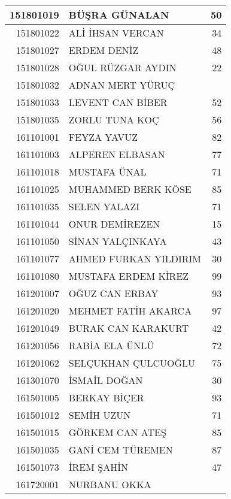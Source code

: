 \documentclass[12pt]{article}
\begin{document}
\begin{longtable}{||r||l||r||}
    \midrule
    151801019 & BÜŞRA GÜNALAN & 50 \\
    \midrule
    151801022 & ALİ İHSAN VERCAN & 34 \\
    \midrule
    151801027 & ERDEM DENİZ & 48 \\
    \midrule
    151801028 & OĞUL RÜZGAR AYDIN & 22 \\
    \midrule
    151801032 & ADNAN MERT YÜRUÇ &  \\
    \midrule
    151801033 & LEVENT CAN BİBER & 52 \\
    \midrule
    151801035 & ZORLU TUNA KOÇ & 56 \\
    \midrule
    161101001 & FEYZA YAVUZ & 82 \\
    \midrule
    161101003 & ALPEREN ELBASAN & 77 \\
    \midrule
    161101018 & MUSTAFA ÜNAL & 71 \\
    \midrule
    161101025 & MUHAMMED BERK KÖSE & 85 \\
    \midrule
    161101035 & SELEN YALAZI & 71 \\
    \midrule
    161101044 & ONUR DEMİREZEN & 15 \\
    \midrule
    161101050 & SİNAN YALÇINKAYA & 43 \\
    \midrule
    161101077 & AHMED FURKAN YILDIRIM & 30 \\
    \midrule
    161101080 & MUSTAFA ERDEM KİREZ & 99 \\
    \midrule
    161201007 & OĞUZ CAN ERBAY & 93 \\
    \midrule
    161201020 & MEHMET FATİH AKARCA & 97 \\
    \midrule
    161201049 & BURAK CAN KARAKURT & 42 \\
    \midrule
    161201056 & RABİA ELA ÜNLÜ & 72 \\
    \midrule
    161201062 & SELÇUKHAN ÇULCUOĞLU & 75 \\
    \midrule
    161301070 & İSMAİL DOĞAN & 30 \\
    \midrule
    161501005 & BERKAY BİÇER & 93 \\
    \midrule
    161501012 & SEMİH UZUN & 71 \\
    \midrule
    161501015 & GÖRKEM CAN ATEŞ & 85 \\
    \midrule
    161501035 & GANİ CEM TÜREMEN & 87 \\
    \midrule
    161501073 & İREM ŞAHİN & 47 \\
    \midrule
    161720001 & NURBANU OKKA &  \\
    \midrule

\end{longtable}
\end{document}
